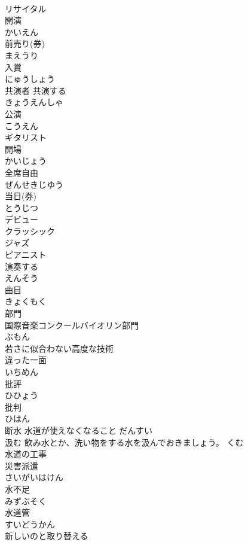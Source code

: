 \documentclass[8pt]{extreport}
\begin{document}
\begin{CJK}{UTF8}{min}
\\	リサイタル	
\\	開演	
\\	かいえん
\\	前売り(券)	
\\	まえうり
\\	入賞	
\\	にゅうしょう
\\	共演者 共演する	
\\	きょうえんしゃ
\\	公演	
\\	こうえん
\\	ギタリスト	
\\	開場	
\\	かいじょう
\\	全席自由	
\\	ぜんせきじゆう
\\	当日(券)	
\\	とうじつ
\\	デビュー	
\\	クラッシック	
\\	ジャズ	
\\	ピアニスト	
\\	演奏する	
\\	えんそう
\\	曲目	
\\	きょくもく
\\	部門 
\\	国際音楽コンクールバイオリン部門	
\\	ぶもん
\\	若さに似合わない高度な技術	
\\	違った一面	
\\	いちめん
\\	批評	
\\	ひひょう
\\	批判	
\\	ひはん
\\	断水	水道が使えなくなること だんすい 
\\	汲む	飲み水とか、洗い物をする水を汲んでおきましょう。 くむ 
\\	水道の工事	
\\	災害派遣	
\\	さいがいはけん
\\	水不足	
\\	みずぶそく
\\	水道管	
\\	すいどうかん
\\	新しいのと取り替える	

\end{CJK}
\end{document}
